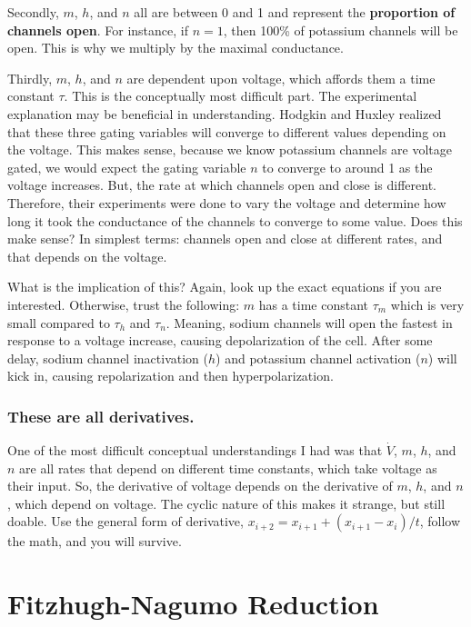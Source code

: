 \documentclass[12pt]{report}
\begin{document}
Secondly, $m$, $h$, and $n$ all are between 0 and 1 and represent the \textbf{proportion of channels open}. For instance, if $n = 1$, then 100\% of potassium channels will be open. This is why we multiply by the maximal conductance.\newline

Thirdly, $m$, $h$, and $n$ are dependent upon voltage, which affords them a time constant $\tau$. This is the conceptually most difficult part. The experimental explanation may be beneficial in understanding. Hodgkin and Huxley realized that these three gating variables will converge to different values depending on the voltage. This makes sense, because we know potassium channels are voltage gated, we would expect the gating variable $n$ to converge to around 1 as the voltage increases. But, the rate at which channels open and close is different. Therefore, their experiments were done to vary the voltage and determine how long it took the conductance of the channels to converge to some value. Does this make sense? In simplest terms: channels open and close at different rates, and that depends on the voltage.\newline

What is the implication of this? Again, look up the exact equations if you are interested. Otherwise, trust the following: $m$ has a time constant $\tau_m$ which is very small compared to $\tau_h$ and $\tau_n$. Meaning, sodium channels will open the fastest in response to a voltage increase, causing depolarization of the cell. After some delay, sodium channel inactivation ($h$) and potassium channel activation ($n$) will kick in, causing repolarization and then hyperpolarization. 

\subsubsection{These are all derivatives.}
One of the most difficult conceptual understandings I had was that $\dot{V}$, $m$, $h$, and $n$ are all rates that depend on different time constants, which take voltage as their input. So, the derivative of voltage depends on the derivative of $m$, $h$, and $n$, which depend on voltage. The cyclic nature of this makes it strange, but still doable. Use the general form of derivative, $x_{i+2} = x_{i+1} + (x_{i+1} - x_i)/t$, follow the math, and you will survive.

\section{Fitzhugh-Nagumo Reduction}
\end{document}
